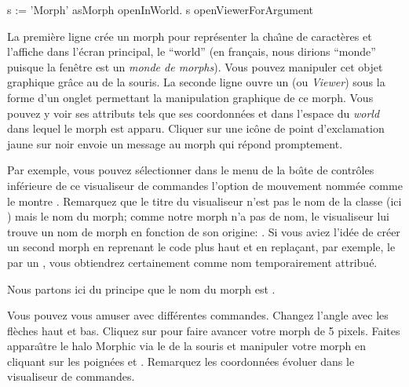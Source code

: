 \documentclass[a4paper,10pt,twoside]{book}
\begin{document}

\begin{code}{}
s := 'Morph' asMorph openInWorld.
s openViewerForArgument
\end{code}

La premi\`ere ligne cr\'ee un morph pour repr\'esenter la cha\^{\i}ne
de caract\`eres  et l'affiche dans
l'\'ecran principal, le ``world'' (en fran\c{c}ais, nous dirions
``monde'' puisque la fen\^etre \pharo est un \emph{monde de morphs}).
Vous pouvez manipuler cet objet graphique gr\^ace au 
de la souris.
La seconde ligne ouvre un  (ou
\emph{Viewer}) sous la forme d'un onglet
permettant la manipulation graphique de ce morph. Vous pouvez y voir
ses attributs tels que ses coordonn\'ees  et  dans
l'espace du \emph{world} dans lequel le morph est apparu.
Cliquer sur une ic\^one de point d'exclamation jaune sur noir envoie un
message au morph qui r\'epond promptement.

Par exemple, vous pouvez s\'electionner dans le menu de la bo\^{\i}te de
contr\^oles inf\'erieure de ce visualiseur de commandes l'option de
mouvement nomm\'ee  comme le montre .
Remarquez que le titre du visualiseur n'est pas le nom de la classe
(ici \mbox{)} mais le nom du morph; comme notre morph n'a pas
de nom, le visualiseur lui trouve un nom de morph en fonction de son
origine: . Si vous aviez l'id\'ee de cr\'eer un second
morph en reprenant le code plus haut et en repla\c{c}ant, par exemple,
le  par un , vous obtiendrez certainement  comme nom
temporairement attribu\'e.

Nous partons ici du principe que le nom du morph est .


Vous pouvez vous amuser avec diff\'erentes commandes. Changez l'angle
avec les fl\`eches haut et bas. Cliquez sur 
pour faire avancer votre morph de 5 pixels. Faites appara\^{\i}tre le halo
Morphic via le  de la souris et manipuler votre
morph en cliquant sur les poign\'ees \grabHandle{} et \rotateHandle{}.
Remarquez les coordonn\'ees \'evoluer dans le visualiseur de commandes.
\end{document}
